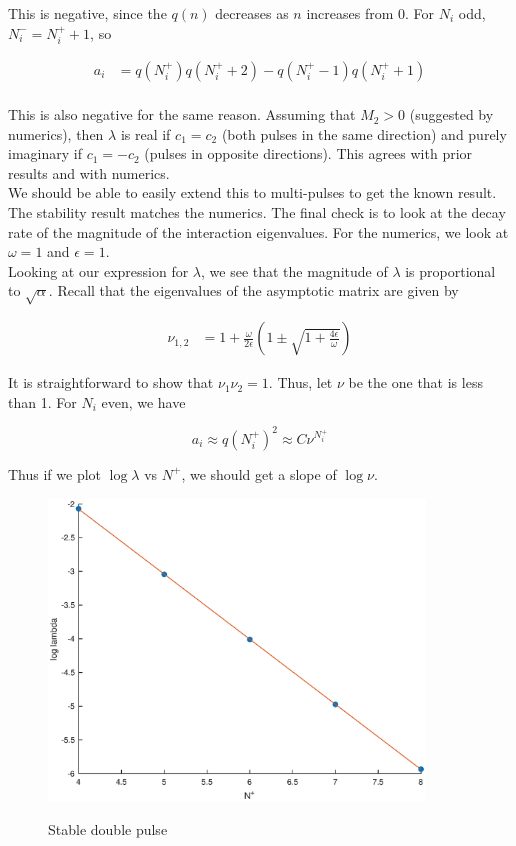 \documentclass[12pt]{article}
\begin{document}
This is negative, since the $q(n)$ decreases as $n$ increases from 0. For $N_i$ odd, $N_i^- = N_i^+ +1$, so

\begin{align*}
a_i &= q(N_i^+)q(N_i^+ + 2) - q(N_i^+ - 1)q(N_i^+ + 1)\\
\end{align*}

This is also negative for the same reason. Assuming that $M_2 > 0$ (suggested by numerics), then $\lambda$ is real if $c_1 = c_2$ (both pulses in the same direction) and purely imaginary if $c_1 = -c_2$ (pulses in opposite directions). This agrees with prior results and with numerics.\\

We should be able to easily extend this to multi-pulses to get the known result.\\

The stability result matches the numerics. The final check is to look at the decay rate of the magnitude of the interaction eigenvalues. For the numerics, we look at $\omega = 1$ and $\epsilon = 1$.\\

Looking at our expression for $\lambda$, we see that the magnitude of $\lambda$ is proportional to $\sqrt{\alpha}$. Recall that the eigenvalues of the asymptotic matrix are given by

\begin{align*}
\nu_{1,2} &= 1 + \frac{\omega}{2 \epsilon} \left( 1 \pm \sqrt{1 + \frac{4 \epsilon}{\omega}} \right)
\end{align*}

It is straightforward to show that $\nu_1 \nu_2 = 1$. Thus, let $\nu$ be the one that is less than 1. For $N_i$ even, we have

\[
a_i \approx q(N_i^+)^2 \approx C \nu^{N_i^+}
\] 

Thus if we plot $\log \lambda$ vs $N^+$, we should get a slope of $\log \nu$.

\begin{figure}[H]
\centering
\includegraphics[width=10cm]{dnlslog.eps}
\label{fig:essspec1}
\caption{Stable double pulse}
\end{figure}
\end{document}
